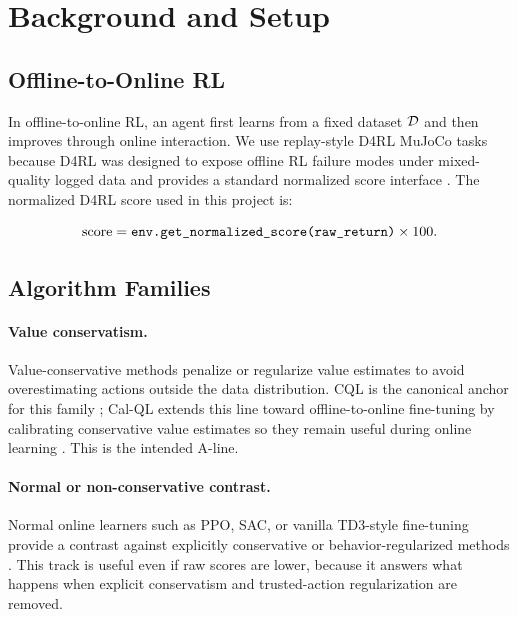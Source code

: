\section{Background and Setup}

\subsection{Offline-to-Online RL}

In offline-to-online RL, an agent first learns from a fixed dataset $\mathcal{D}$ and then improves through online interaction. We use replay-style D4RL MuJoCo tasks because D4RL was designed to expose offline RL failure modes under mixed-quality logged data and provides a standard normalized score interface \citep{fu2020d4rl}. The normalized D4RL score used in this project is:

\[
\mathrm{score} = \texttt{env.get\_normalized\_score(raw\_return)} \times 100.
\]

\subsection{Algorithm Families}

\paragraph{Value conservatism.}
Value-conservative methods penalize or regularize value estimates to avoid overestimating actions outside the data distribution. CQL is the canonical anchor for this family \citep{kumar2020cql}; Cal-QL extends this line toward offline-to-online fine-tuning by calibrating conservative value estimates so they remain useful during online learning \citep{nakamoto2023calql}. This is the intended A-line.


\paragraph{Normal or non-conservative contrast.}
Normal online learners such as PPO, SAC, or vanilla TD3-style fine-tuning provide a contrast against explicitly conservative or behavior-regularized methods \citep{schulman2017ppo,haarnoja2018sac,fujimoto2018td3}. This track is useful even if raw scores are lower, because it answers what happens when explicit conservatism and trusted-action regularization are removed.

